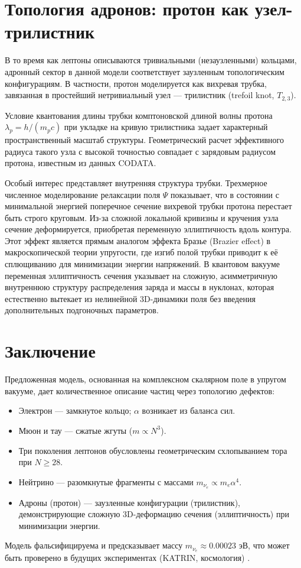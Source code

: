 \documentclass[12pt,a4paper]{article}
\begin{document}
\section{Топология адронов: протон как узел-трилистник}

В то время как лептоны описываются тривиальными (незаузленными) кольцами, адронный сектор в данной модели соответствует заузленным топологическим конфигурациям. В частности, протон моделируется как вихревая трубка, завязанная в простейший нетривиальный узел — трилистник (trefoil knot, $T_{2,3}$).

Условие квантования длины трубки комптоновской длиной волны протона $\lambda_p = h/(m_p c)$ при укладке на кривую трилистника задает характерный пространственный масштаб структуры. Геометрический расчет эффективного радиуса такого узла с высокой точностью совпадает с зарядовым радиусом протона, известным из данных CODATA.

Особый интерес представляет внутренняя структура трубки. Трехмерное численное моделирование релаксации поля $\Psi$ показывает, что в состоянии с минимальной энергией поперечное сечение вихревой трубки протона перестает быть строго круговым. Из-за сложной локальной кривизны и кручения узла сечение деформируется, приобретая переменную эллиптичность вдоль контура. Этот эффект является прямым аналогом эффекта Бразье (Brazier effect) в макроскопической теории упругости, где изгиб полой трубки приводит к её сплющиванию для минимизации энергии напряжений. В квантовом вакууме переменная эллиптичность сечения указывает на сложную, асимметричную внутреннюю структуру распределения заряда и массы в нуклонах, которая естественно вытекает из нелинейной 3D-динамики поля без введения дополнительных подгоночных параметров.

\section{Заключение}

Предложенная модель, основанная на комплексном скалярном поле в упругом вакууме, дает количественное описание частиц через топологию дефектов:
\begin{itemize}
    \item Электрон — замкнутое кольцо; $\alpha$ возникает из баланса сил.
    \item Мюон и тау — сжатые жгуты ($m \propto N^3$).
    \item Три поколения лептонов обусловлены геометрическим схлопыванием тора при $N \ge 28$.
    \item Нейтрино — разомкнутые фрагменты с массами $m_{\nu_e} \propto m_e \alpha^4$.
    \item Адроны (протон) — заузленные конфигурации (трилистник), демонстрирующие сложную 3D-деформацию сечения (эллиптичность) при минимизации энергии.
\end{itemize}
Модель фальсифицируема и предсказывает массу $m_{\nu_e} \approx 0.00023$ эВ, что может быть проверено в будущих экспериментах (KATRIN, космология) \cite{katrin2022, katrin2025}.
\end{document}
